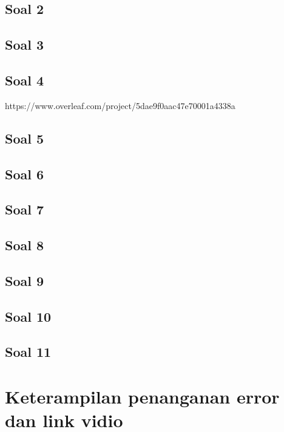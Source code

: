 \documentclass{article}
\begin{document}
    \subsection{Soal 2}
            
    \subsection{Soal 3}
        
    \subsection{Soal 4}
https://www.overleaf.com/project/5dae9f0aac47e70001a4338a        
    \subsection{Soal 5}
        
    \subsection{Soal 6}
        
    \subsection{Soal 7}
        
    \subsection{Soal 8}
        
    \subsection{Soal 9}
        
    \subsection{Soal 10}
        
    \subsection{Soal 11}
        
    
\section{Keterampilan penanganan error dan link vidio}    
\end{document}
